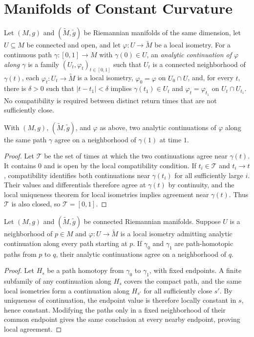 \section{Manifolds of Constant Curvature}

Let $(M,g)$ and $(\widetilde M,\widetilde g)$ be Riemannian manifolds of the
same dimension, let $U\subseteq M$ be connected and open, and let
$\varphi:U\to\widetilde M$ be a local isometry.  For a continuous path
$\gamma:[0,1]\to M$ with $\gamma(0)\in U$, an \emph{analytic continuation of
$\varphi$ along $\gamma$} is a family $(U_t,\varphi_t)_{t\in[0,1]}$ such that
$U_t$ is a connected neighborhood of $\gamma(t)$, each
$\varphi_t:U_t\to\widetilde M$ is a local isometry, $\varphi_0=\varphi$ on
$U_0\cap U$, and, for every $t$, there is $\delta>0$ such that
$|t-t_1|<\delta$ implies $\gamma(t_1)\in U_t$ and $\varphi_t=\varphi_{t_1}$
on $U_t\cap U_{t_1}$.  No compatibility is required between distinct return
times that are not sufficiently close.

\begin{lemma}
\label{lem:uniqueness-analytic-continuation}
With $(M,g)$, $(\widetilde M,\widetilde g)$, and $\varphi$ as above, two
analytic continuations of $\varphi$ along the same path $\gamma$ agree on a
neighborhood of $\gamma(1)$ at time $1$.
\begin{proof}
\sketch Let $\mathcal T$ be the set of times at which the two continuations
agree near $\gamma(t)$.  It contains $0$ and is open by the local compatibility
condition.  If $t_i\in\mathcal T$ and $t_i\to t$, compatibility identifies both
continuations near $\gamma(t_i)$ for all sufficiently large $i$.  Their values
and differentials therefore agree at $\gamma(t)$ by continuity, and the local
uniqueness theorem for local isometries implies agreement near $\gamma(t)$.
Thus $\mathcal T$ is also closed, so $\mathcal T=[0,1]$.
\end{proof}
\end{lemma}

\begin{theorem}
\label{thm:monodromy-theorem-local-isometries}
Let $(M,g)$ and $(\widetilde M,\widetilde g)$ be connected Riemannian
manifolds.  Suppose $U$ is a neighborhood of $p\in M$ and
$\varphi:U\to\widetilde M$ is a local isometry admitting analytic continuation
along every path starting at $p$.  If $\gamma_0$ and $\gamma_1$ are
path-homotopic paths from $p$ to $q$, their analytic continuations agree on a
neighborhood of $q$.
\begin{proof}
\sketch Let $H_s$ be a path homotopy from $\gamma_0$ to $\gamma_1$, with
fixed endpoints.  A finite subfamily of any continuation along $H_s$ covers
the compact path, and the same local isometries form a continuation along
$H_{s'}$ for all sufficiently close $s'$.  By uniqueness of continuation,
the endpoint value is therefore locally constant in $s$, hence constant.
Modifying the paths only in a fixed neighborhood of their common endpoint
gives the same conclusion at every nearby endpoint, proving local agreement.
\end{proof}
\end{theorem}

